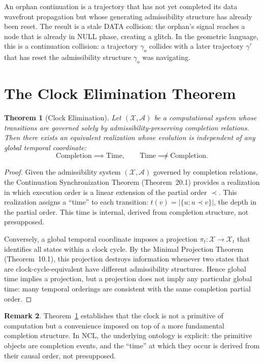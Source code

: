 \documentclass[12pt, oneside]{book}
\theoremstyle{flyxion}
\newtheorem{theorem}{Theorem}[chapter]
\theoremstyle{definition}
\newtheorem{remark}[theorem]{Remark}
\begin{document}
An orphan continuation is a trajectory that has not
yet completed its data wavefront propagation but whose
generating admissibility structure has already been
reset. The result is a stale DATA collision: the
orphan's signal reaches a node that is already in
NULL phase, creating a glitch. In the geometric
language, this is a continuation collision: a
trajectory $\gamma_o$ collides with a later trajectory
$\gamma'$ that has reset the admissibility structure
$\gamma_o$ was navigating.

\section{The Clock Elimination Theorem}

\begin{theorem}[Clock Elimination]
\label{thm:clock_elimination}
Let $(\mathcal{X}, \mathcal{A})$ be a computational
system whose transitions are governed solely by
admissibility-preserving completion relations. Then
there exists an equivalent realization whose evolution
is independent of any global temporal coordinate:
\[
\text{Completion} \implies \text{Time},
\qquad
\text{Time} \not\implies \text{Completion}.
\]
\end{theorem}

\begin{proof}
Given the admissibility system $(\mathcal{X},
\mathcal{A})$ governed by completion relations, the
Continuation Synchronization Theorem (Theorem~20.1)
provides a realization in which execution order is a
linear extension of the partial order $\prec$. This
realization assigns a ``time'' to each transition:
$t(v) = |\{u : u \prec v\}|$, the depth in the
partial order. This time is internal, derived from
completion structure, not presupposed.

Conversely, a global temporal coordinate imposes a
projection $\pi_t : \mathcal{X} \to \mathcal{X}_t$
that identifies all states within a clock cycle. By
the Minimal Projection Theorem (Theorem~10.1), this
projection destroys information whenever two states
that are clock-cycle-equivalent have different
admissibility structures. Hence global time implies
a projection, but a projection does not imply any
particular global time: many temporal orderings are
consistent with the same completion partial order.
\end{proof}

\begin{remark}
Theorem~\ref{thm:clock_elimination} establishes that
the clock is not a primitive of computation but a
convenience imposed on top of a more fundamental
completion structure. In NCL, the underlying ontology
is explicit: the primitive objects are completion
events, and the ``time'' at which they occur is
derived from their causal order, not presupposed.
\end{remark}
\end{document}
